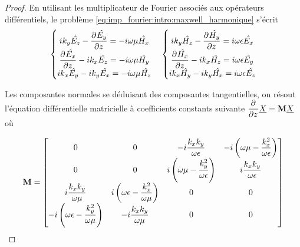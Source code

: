     \begin{proof}
        En utilisant les multiplicateur de Fourier associés aux opérateurs différentiels, le problème \eqref{eq:imp_fourier:intro:maxwell_harmonique} s'écrit
        \begin{align*}
            \left\lbrace 
            \begin{matrix}
            ik_y \hat{E_z}  - \ddr{z}{\hat{E_y}} = -i \w \mu \hat{H_x} \\
            \ddr{z}{\hat{E_x}} - ik_x \hat{E_z} = -i\w \mu \hat{H_y} \\
            ik_x \hat{E_y} - ik_y \hat{E_x} = -i\w \mu \hat{H_z} \\
            \end{matrix}
            \right. \quad 
            \left\lbrace 
            \begin{matrix}
            ik_y \hat{H_z}  - \ddr{z}{\hat{H_y}} = i \w \eps \hat{E_x} \\
            \ddr{z}{\hat{H_x}} - ik_x \hat{H_z} = i\w \eps \hat{E_y} \\
            ik_x \hat{H_y} - ik_y \hat{H_x} = i\w \eps \hat{E_z} \\
            \end{matrix}
            \right.
        \end{align*}

        Les composantes normales se déduisant des composantes tangentielles, on résout l'équation différentielle  matricielle à coefficients constants 
        suivante $\ddr{z}{}\v{X} = \mat{M} \v{X}$ où

        \begin{equation}
            \mat{M} = \begin{bmatrix}
            0 & 0 & -i\frac{k_xk_y}{\w\eps} & -i\left(\w\mu - \frac{k_x^2}{\w\eps}\right)\\
            0 & 0 & i\left(\w\mu - \frac{k_y^2}{\w\eps}\right) & i\frac{k_xk_y}{\w\eps}\\
            i\frac{k_xk_y}{\w\mu} & i\left(\w\eps - \frac{k_x^2}{\w\mu}\right) & 0 & 0 \\
            -i\left(\w\eps - \frac{k_y^2}{\w\mu}\right) & -i\frac{k_xk_y}{\w\mu} & 0 & 0 \\
            \end{bmatrix}
        \end{equation}
    \end{proof}

